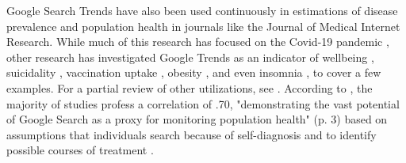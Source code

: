 Google Search Trends have also been used continuously in estimations of
disease prevalence and population health in journals like the Journal of
Medical Internet Research. While much of this research has focused on
the Covid-19 pandemic \citep{jimenez_etal20,
jimenezCOVID19SymptomGoogle2020,
limEstimatingInformationSeekingBehaviour2020,
mavraganiCOVID19PredictabilityUnited2020,
nguyenGoogleTrendsAnalysis2020, todorovaInternetBasedData2021} , other
research has investigated Google Trends as an indicator of wellbeing
\citep{brodeurCOVID19LockdownsWellbeing2021,
carpiTwitterSubjectiveWellBeing2020, duCOVID19IncreasesOnline2020},
suicidality \citep{burnettTimeTrendsPublic2020}, vaccination uptake
\citep{dalumhansenEnsembleLearnedVaccination2016}, obesity
\citep{sarigulNowcastingObesityUsing2014}, and even insomnia
\citep{zittingGoogleTrendsReveal2020}, to cover a few examples. For a partial
review of other utilizations, see \citet{nutiUseGoogleTrends2014}. According to
\citet{jaidkaInformationseekingVsSharing2021}, the majority of studies profess
a correlation of \> .70, "demonstrating the vast potential of Google
Search as a proxy for monitoring population health" (p. 3) based on
assumptions that individuals search because of self-diagnosis and to
identify possible courses of treatment
\citep{dechoudhurySeekingSharingHealth2014}.







